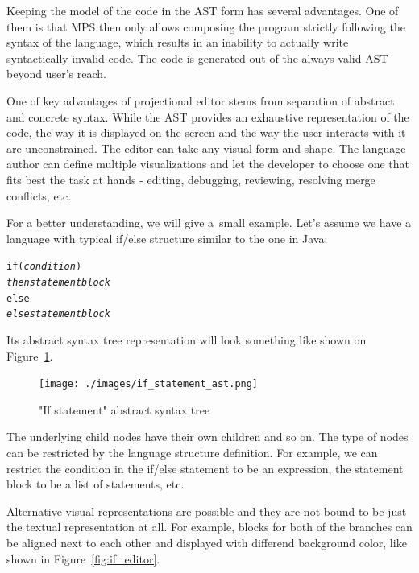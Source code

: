 Keeping the model of the code in the AST form has several advantages.
One of them is that MPS then only allows composing the program strictly following the syntax of the language, which results in an inability to actually write syntactically invalid code.
The code is generated out of the always-valid AST beyond user's reach.

 One of key advantages of projectional editor stems from separation of abstract and concrete syntax. While the AST provides an exhaustive representation of the code, the way it is displayed on the screen and the way the user interacts with it are unconstrained. The editor can take any visual form and shape. The language author can define multiple visualizations and let the developer to choose one that fits best the task at hands - editing, debugging, reviewing, resolving merge conflicts, etc.

For a better understanding, we will give a~small example. Let's assume we have a language with typical if/else structure similar to the one in Java:

\begin{center}
	\begin{minipage}{.38\textwidth}
		\begin{alltt}
			if (\textit{condition})
			    \textit{then statement block}
			else
			    \textit{else statement block}
		\end{alltt}
	\end{minipage}
\end{center}

Its abstract syntax tree representation will look something like shown on Figure~\ref{fig:if_ast}.

\begin{figure}[ht]
  \centering
  \texttt{[image: ./images/if\_statement\_ast.png]}
  \caption{"If statement" abstract syntax tree}
  \label{fig:if_ast}
\end{figure}

The underlying child nodes have their own children and so on. The type of nodes can be restricted by the language structure definition. For example, we can restrict the condition in the if/else statement to be an expression, the statement block to be a list of statements, etc.

 Alternative visual representations are possible and they are not bound to be just the textual representation at all. For example, blocks for both of the branches can be aligned next to each other and displayed with differend background color, like shown in Figure~\ref{fig:if_editor}.

